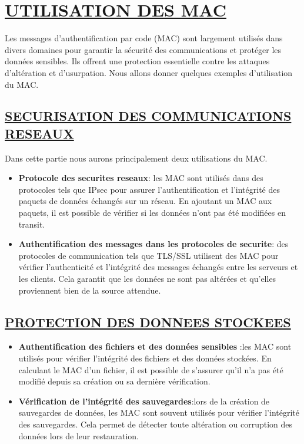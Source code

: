 \section{\textbf{\underline{UTILISATION DES MAC}}}

Les messages d'authentification par code (MAC) sont largement utilisés dans divers domaines pour garantir la sécurité des communications et protéger les données sensibles. Ils offrent une protection essentielle contre les attaques d'altération et d'usurpation. Nous allons donner quelques exemples d'utilisation du MAC.
\subsection{\textbf{\underline{SECURISATION DES COMMUNICATIONS RESEAUX}}}
Dans cette partie nous aurons principalement deux utilisations du MAC.
\begin{itemize}[label=$\cdot$]
    \item \textbf{\-Protocole des securites reseaux}: les MAC sont utilisés dans des protocoles tels que IPsec pour assurer l'authentification et l'intégrité des paquets de données échangés sur un réseau. En ajoutant un MAC aux paquets, il est possible de vérifier si les données n'ont pas été modifiées en transit.
    \item \textbf{\-Authentification des messages dans les protocoles de securite}: des protocoles de communication tels que TLS/SSL utilisent des MAC pour vérifier l'authenticité et l'intégrité des messages échangés entre les serveurs et les clients. Cela garantit que les données ne sont pas altérées et qu'elles proviennent bien de la source attendue.

\end{itemize}

\subsection{\textbf{\underline{PROTECTION DES DONNEES STOCKEES}}}

\begin{itemize}[label=$\cdot$]
    \item \textbf{\-Authentification des fichiers et des données sensibles} :les MAC sont utilisés pour vérifier l'intégrité des fichiers et des données stockées. En calculant le MAC d'un fichier, il est possible de s'assurer qu'il n'a pas été modifié depuis sa création ou sa dernière vérification.
    \item \textbf{\-Vérification de l'intégrité des sauvegardes}:lors de la création de sauvegardes de données, les MAC sont souvent utilisés pour vérifier l'intégrité des sauvegardes. Cela permet de détecter toute altération ou corruption des données lors de leur restauration.
\end{itemize}

